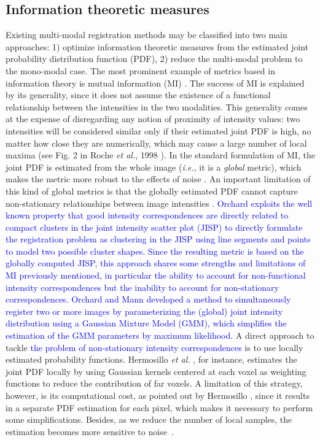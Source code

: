 \subsection{Information theoretic measures}
Existing multi-modal registration methods may be classified into two main approaches: 1) optimize information theoretic measures from the estimated joint probability distribution function (PDF), 2) reduce the multi-modal problem to the mono-modal case. The most prominent example of metrics based in information theory is mutual information (MI) \cite{Maes1997, Mattes2003}. The success of MI is explained by its generality, since it does not assume the existence of a functional relationship between the intensities in the two modalities. This generality comes at the expense of disregarding any notion of proximity of intensity values: two intensities will be considered similar only if their estimated joint PDF is high, no matter how close they are numerically, which may cause a large number of local maxima (see Fig. 2 in Roche {\it et al.}, 1998 \cite{Roche1998}). In the standard formulation of MI, the joint PDF is estimated from the whole image ({\it i.e.}, it is a {\it global} metric), which makes the metric more robust to the effects of noise \cite{Mattes2003}. An important limitation of this kind of global metrics is that the globally estimated PDF cannot capture non-stationary relationships between image intensities \cite{Hermosillo2004}. \textcolor{blue}{Orchard \cite{Orchard2008} exploits the well known property \cite{Hermosillo2004} that good intensity correspondences are directly related to compact clusters in the joint intensity scatter plot (JISP)
to directly formulate the registration problem as clustering in the JISP using line segments and points to model two possible cluster shapes. Since the resulting metric is based on the globally computed JISP, this approach shares some strengths and limitations of MI previously mentioned, in particular the ability to account for non-functional intensity correspondences but the inability to account for non-stationary correspondences. Orchard and Mann \cite{Orchard2010} developed a method to simultaneously register two or more images by parameterizing the (global) joint intensity distribution using a Gaussian Mixture Model (GMM), which simplifies the estimation of the GMM parameters by maximum likelihood.} A direct approach to tackle \textcolor{blue}{the problem of non-stationary intensity correspondences} is to use locally estimated probability functions. Hermosillo {\it et al.} \cite{Hermosillo2004}, for instance, estimates the joint PDF locally by using Gaussian kernels centered at each voxel as weighting functions to reduce the contribution of far voxels. A limitation of this strategy, however, is its computational cost, as pointed out by Hermosillo \cite{Hermosillo2004}, since it results in a separate PDF estimation for each pixel, which makes it necessary to perform some simplifications. Besides, as we reduce the number of local samples, the estimation becomes more sensitive to noise~\cite{Mattes2003}.

